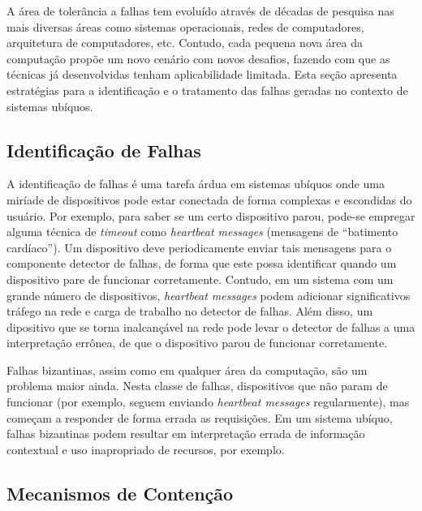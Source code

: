 A área de tolerância a falhas tem evoluído através de décadas de pesquisa nas mais diversas áreas como sistemas operacionais, redes de computadores, arquitetura de computadores, etc. Contudo, cada pequena nova área da computação propõe um novo cenário com novos desafios, fazendo com que as técnicas já desenvolvidas tenham aplicabilidade limitada. Esta seção apresenta estratégias para a identificação e o tratamento das falhas geradas no contexto de sistemas ubíquos.

\subsection{Identificação de Falhas} %
\label{sub:identificacao}

A identificação de falhas é uma tarefa árdua em sistemas ubíquos onde uma miríade de dispositivos pode estar conectada de forma complexas e escondidas do usuário. Por exemplo, para saber se um certo dispositivo parou, pode-se empregar alguma técnica de \emph{timeout} como \emph{heartbeat messages} (mensagens de ``batimento cardíaco''). Um dispositivo deve periodicamente enviar tais mensagens para o componente detector de falhas, de forma que este possa identificar quando um dispositivo pare de funcionar corretamente. Contudo, em um sistema com um grande número de dispositivos, \emph{heartbeat messages} podem adicionar significativos tráfego na rede e carga de trabalho no detector de falhas. Além disso, um dipositivo que se torna inalcançável na rede pode levar o detector de falhas a uma interpretação errônea, de que o dispositivo parou de funcionar corretamente.

Falhas bizantinas, assim como em qualquer área da computação, são um problema maior ainda. Nesta classe de falhas, dispositivos que não param de funcionar (por exemplo, seguem enviando \emph{heartbeat messages} regularmente), mas começam a responder de forma errada as requisições. Em um sistema ubíquo, falhas bizantinas podem resultar em interpretação errada de informação contextual e uso inapropriado de recursos, por exemplo.




\subsection{Mecanismos de Contenção} %
\label{sub:mecanismos_de_contencao}



